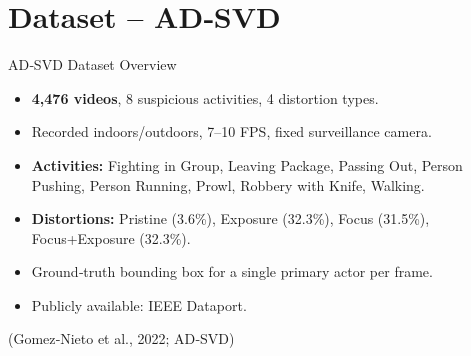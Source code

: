 \documentclass[compress,aspectratio=169]{beamer}
\begin{document}
\section{Dataset – AD‑SVD}

\begin{frame}{AD‑SVD Dataset Overview}
  \begin{itemize}
    \item \textbf{4,476 videos}, 8 suspicious activities, 4 distortion types.
    \item Recorded indoors/outdoors, 7–10 FPS, fixed surveillance camera.
    \item \textbf{Activities:} Fighting in Group, Leaving Package, Passing Out, Person Pushing, Person Running, Prowl, Robbery with Knife, Walking.
    \item \textbf{Distortions:} Pristine (3.6\%), Exposure (32.3\%), Focus (31.5\%), Focus+Exposure (32.3\%).
    \item Ground‑truth bounding box for a single primary actor per frame.
    \item Publicly available: \alert{IEEE Dataport}.
  \end{itemize}
  \vspace{0.3cm}
  \footnotesize
  (Gomez‑Nieto et al., 2022; AD‑SVD)
\end{frame}
\end{document}
